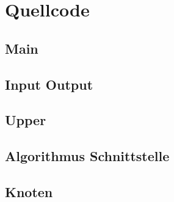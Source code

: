 \chapter{Quellcode}

\section{Main}

\section{Input Output}

\section{Upper}

\section{Algorithmus Schnittstelle}

\section{Knoten}
